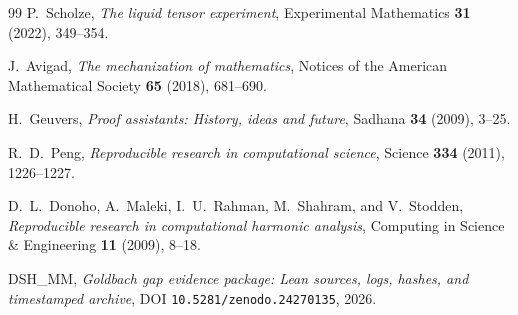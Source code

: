 \documentclass[11pt,a4paper]{article}
\theoremstyle{plain}
\theoremstyle{definition}
\begin{document}
\begin{thebibliography}{99}
P.~Scholze,
\emph{The liquid tensor experiment},
Experimental Mathematics \textbf{31} (2022), 349--354.

J.~Avigad,
\emph{The mechanization of mathematics},
Notices of the American Mathematical Society \textbf{65} (2018), 681--690.

H.~Geuvers,
\emph{Proof assistants: History, ideas and future},
Sadhana \textbf{34} (2009), 3--25.

R.~D.~Peng,
\emph{Reproducible research in computational science},
Science \textbf{334} (2011), 1226--1227.

D.~L.~Donoho, A.~Maleki, I.~U.~Rahman, M.~Shahram, and V.~Stodden,
\emph{Reproducible research in computational harmonic analysis},
Computing in Science \& Engineering \textbf{11} (2009), 8--18.

DSH\_MM,
\emph{Goldbach gap evidence package: Lean sources, logs, hashes, and timestamped archive},
DOI \texttt{10.5281/zenodo.24270135}, 2026.

\end{thebibliography}
\end{document}
